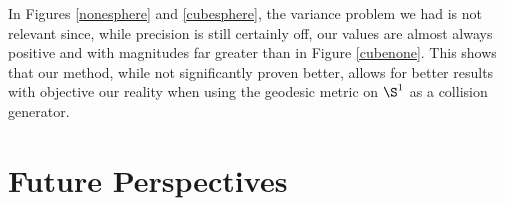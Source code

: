 \documentclass[math, info, english]{cours}
\begin{document}
In Figures \ref{nonesphere} and \ref{cubesphere}, the variance problem we had is not relevant since, while precision is still certainly off, our values are almost always positive and with magnitudes far greater than in Figure \ref{cubenone}.
This shows that our method, while not significantly proven better, allows for better results with objective our reality when using the geodesic metric on $\S^{1}$ as a collision generator.

\section{Future Perspectives}




\appendix


\end{document}
